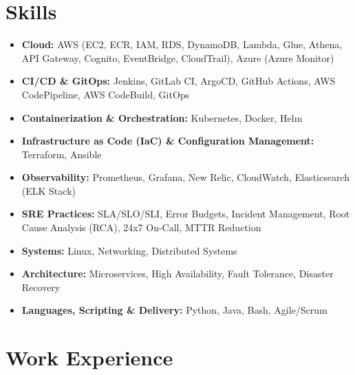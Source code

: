 \documentclass[a4paper,10.999999pt]{article}
\begin{document}
    \section{Skills}
    \begin{itemize}[leftmargin=1.35em, itemsep=0.35pt, topsep=0.3pt, parsep=0pt, label=\raisebox{0.25ex}{\tiny$\circ$}]
    \item \textbf{Cloud:} AWS (EC2, ECR, IAM, RDS, DynamoDB, Lambda, Glue, Athena, API Gateway, Cognito, EventBridge, CloudTrail), Azure (Azure Monitor)
    \item \textbf{CI/CD \& GitOps:} Jenkins, GitLab CI, ArgoCD, GitHub Actions, AWS CodePipeline, AWS CodeBuild, GitOps
    \item \textbf{Containerization \& Orchestration:} Kubernetes, Docker, Helm
    \item \textbf{Infrastructure as Code (IaC) \& Configuration Management:} Terraform, Ansible
    \item \textbf{Observability:} Prometheus, Grafana, New Relic, CloudWatch, Elasticsearch (ELK Stack)
    \item \textbf{SRE Practices:} SLA/SLO/SLI, Error Budgets, Incident Management, Root Cause Analysis (RCA), 24x7 On-Call, MTTR Reduction
    \item \textbf{Systems:} Linux, Networking, Distributed Systems
    \item \textbf{Architecture:} Microservices, High Availability, Fault Tolerance, Disaster Recovery
    \item \textbf{Languages, Scripting \& Delivery:} Python, Java, Bash, Agile/Scrum
    \end{itemize}
    
    
    \section{Work Experience}
    
\end{document}
